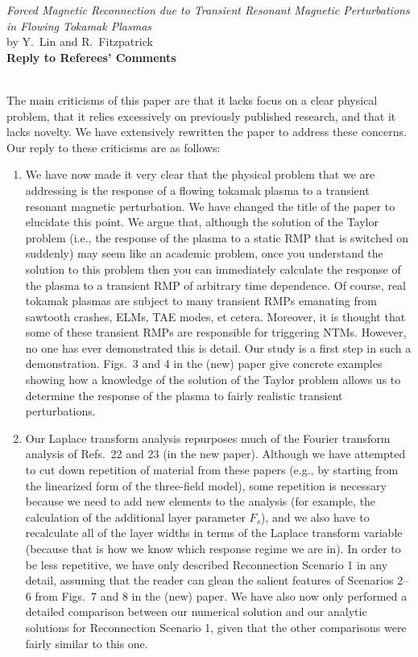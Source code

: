 \documentclass{article}[12pt]
\begin{document}
\begin{center}
{\em  Forced Magnetic Reconnection due to Transient Resonant Magnetic Perturbations in Flowing Tokamak Plasmas}\\[1ex]
by Y.~Lin and R.~Fitzpatrick\\[1ex]
{\bf Reply to Referees' Comments}\\[1ex]
~
\end{center}
The main criticisms of this paper are that it lacks focus on a clear physical problem, that it relies excessively on previously published research, and that
it lacks novelty. We have extensively rewritten the paper to address these concerns. Our reply to these criticisms are as follows:
\begin{enumerate}

\item We have now made it very clear that the physical problem that we are addressing is the response of a flowing tokamak plasma to a transient resonant
magnetic perturbation. We have changed the title of the paper to elucidate this point. We argue that, although the solution of
the Taylor problem (i.e., the response of the plasma to a static RMP that is switched on suddenly) may seem like an academic problem, once you understand
the solution to this problem then you can immediately calculate the response of the plasma to a transient RMP of arbitrary time dependence. Of course,
real tokamak plasmas are subject to many transient RMPs emanating from sawtooth crashes, ELMs, TAE modes, et cetera. Moreover, it is thought that
some of these transient RMPs are responsible for triggering NTMs. However, no one has ever demonstrated this is detail. Our study is a first step
in such a demonstration. Figs.~3 and 4 in the (new) paper give concrete examples showing how a knowledge of the solution of the Taylor problem
allows us to determine the response of the plasma to fairly realistic transient perturbations. 

\item Our Laplace transform analysis repurposes much of the Fourier transform analysis of Refs.~22 and 23 (in the new paper). Although we have attempted
to cut down repetition of material from these papers (e.g., by starting from the linearized form of the three-field model), some repetition is necessary because
we need to add new elements to the analysis (for example, the calculation of the additional layer parameter $F_s$), and we also have to recalculate all of the layer widths in terms
of the Laplace transform variable (because that is how we know which response regime we are in). In order to be less repetitive, we have only
described Reconnection Scenario 1 in any detail, assuming that the reader can glean the salient features of Scenarios 2--6 from Figs.~7 and 8 in the
(new) paper. We have also now only performed a detailed comparison between our numerical solution and our analytic solutions for Reconnection Scenario 1,
given that the other comparisons were fairly similar to this one. 


\end{enumerate}
\end{document}
